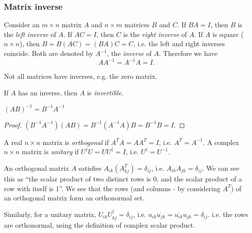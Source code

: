 \documentclass[a4paper]{article}
\begin{document}
\subsubsection{Matrix inverse}

\begin{defi}
  Consider an $m\times n$ matrix $A$ and $n\times m$ matrices $B$ and $C$. If $BA = I$, then $B$ is the \emph{left inverse} of $A$. If $AC = I$, then $C$ is the \emph{right inverse} of $A$. If $A$ is square ($n\times n$), then $B = B(AC) = (BA)C = C$, i.e. the left and right inverses coincide. Both are denoted by $A^{-1}$, the \emph{inverse} of $A$. Therefore we have
\[
AA^{-1} = A^{-1}A = I.
\]
\end{defi}
\note Not all matrices have inverses, e.g. the zero matrix.
\begin{defi}
  If $A$ has an inverse, then $A$ is \emph{invertible}.
\end{defi}

\begin{prop}
  $(AB)^{-1} = B^{-1}A^{-1}$
\end{prop}

\begin{proof}
  $(B^{-1}A^{-1})(AB) = B^{-1}(A^{-1}A)B = B^{-1}B = I$.
\end{proof}

\begin{defi}
  A real $n\times n$ matrix is \emph{orthogonal} if $A^TA = AA^T = I$, i.e. $A^T = A^{-1}$. A complex $n\times n$ matrix is \emph{unitary} if $U^\dagger U = UU^\dagger = I$, i.e. $U^\dagger = U^{-1}$.
\end{defi}
\note An orthogonal matrix $A$ satisfies $A_{ik}(A^T_{kj}) = \delta_{ij}$, i.e. $A_{ik}A_{jk} = \delta_{ij}$. We can see this as ``the scalar product of two distinct rows is 0, and the scalar product of a row with itself is 1''. We see that the rows (and columns - by considering $A^T$) of an orthogonal matrix form an orthonormal set.

Similarly, for a unitary matrix, $U_{ik}U_{kj}^\dagger = \delta_{ij}$, i.e. $u_{ik}\overline{u_{jk}} = \overline{u_{ik}}u_{jk} =\delta_{ij}$. i.e. the rows are orthonormal, using the definition of complex scalar product.
\end{document}
